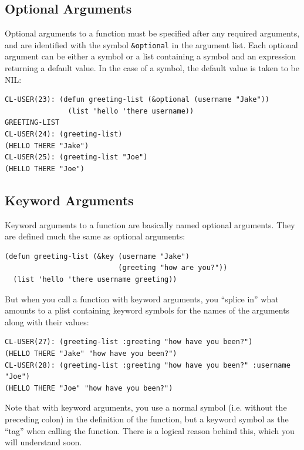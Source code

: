 \subsection{Optional Arguments}

Optional arguments to a function must be specified after any required arguments, and are
identified with the symbol \texttt{\&optional} in the argument list. Each optional argument can be
either a symbol or a list containing a symbol and an expression returning a default value.
In the case of a symbol, the default value is taken to be NIL:

\begin{verbatim}
CL-USER(23): (defun greeting-list (&optional (username "Jake"))
               (list 'hello 'there username))
GREETING-LIST
CL-USER(24): (greeting-list)
(HELLO THERE "Jake")
CL-USER(25): (greeting-list "Joe")
(HELLO THERE "Joe")
\end{verbatim}

\subsection{Keyword Arguments}

Keyword arguments to a function are basically named optional arguments. They are defined
much the same as optional arguments:

\begin{verbatim}
(defun greeting-list (&key (username "Jake")
                           (greeting "how are you?"))
  (list 'hello 'there username greeting))
\end{verbatim}

But when you call a function with keyword arguments, you ``splice in'' what amounts to a
plist containing keyword symbols for the names of the arguments along with their values:

\begin{verbatim}
CL-USER(27): (greeting-list :greeting "how have you been?")
(HELLO THERE "Jake" "how have you been?")
CL-USER(28): (greeting-list :greeting "how have you been?" :username "Joe")
(HELLO THERE "Joe" "how have you been?")
\end{verbatim}

Note that with keyword arguments, you use a normal symbol (i.e. without the preceding
colon) in the definition of the function, but a keyword symbol as the ``tag'' when calling
the function. There is a logical reason behind this, which you will understand soon.


